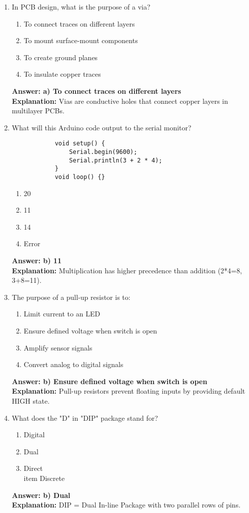 \documentclass{article}
\begin{document}
\begin{enumerate}
		\item In PCB design, what is the purpose of a via?
		\begin{enumerate}
			\item To connect traces on different layers
			\item To mount surface-mount components
			\item To create ground planes
			\item To insulate copper traces
		\end{enumerate}
		\textbf{Answer: a) To connect traces on different layers} \\
		\textbf{Explanation:} Vias are conductive holes that connect copper layers in multilayer PCBs.
		
		\item What will this Arduino code output to the serial monitor?
		\begin{verbatim}
			void setup() {
				Serial.begin(9600);
				Serial.println(3 + 2 * 4);
			}
			void loop() {}
		\end{verbatim}
		\begin{enumerate}
			\item 20
			\item 11
			\item 14
			\item Error
		\end{enumerate}
		\textbf{Answer: b) 11} \\
		\textbf{Explanation:} Multiplication has higher precedence than addition (2*4=8, 3+8=11).
		
		\item The purpose of a pull-up resistor is to:
		\begin{enumerate}
			\item Limit current to an LED
			\item Ensure defined voltage when switch is open
			\item Amplify sensor signals
			\item Convert analog to digital signals
		\end{enumerate}
		\textbf{Answer: b) Ensure defined voltage when switch is open} \\
		\textbf{Explanation:} Pull-up resistors prevent floating inputs by providing default HIGH state.
		
		\item What does the "D" in "DIP" package stand for?
		\begin{enumerate}
			\item Digital
			\item Dual
			\item Direct
			\\item Discrete
		\end{enumerate}
		\textbf{Answer: b) Dual} \\
		\textbf{Explanation:} DIP = Dual In-line Package with two parallel rows of pins.
		

\end{enumerate}
\end{document}
